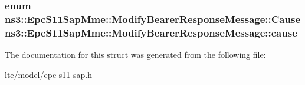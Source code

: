 \subsubsection[{\texorpdfstring{cause}{cause}}]{\setlength{\rightskip}{0pt plus 5cm}enum {\bf ns3\+::\+Epc\+S11\+Sap\+Mme\+::\+Modify\+Bearer\+Response\+Message\+::\+Cause}  ns3\+::\+Epc\+S11\+Sap\+Mme\+::\+Modify\+Bearer\+Response\+Message\+::cause}\hypertarget{structns3_1_1EpcS11SapMme_1_1ModifyBearerResponseMessage_a2b554ce8ee8f5fd4ba1752c850335860}{}\label{structns3_1_1EpcS11SapMme_1_1ModifyBearerResponseMessage_a2b554ce8ee8f5fd4ba1752c850335860}


The documentation for this struct was generated from the following file\+:\begin{DoxyCompactItemize}
\item 
lte/model/\hyperlink{epc-s11-sap_8h}{epc-\/s11-\/sap.\+h}\end{DoxyCompactItemize}
